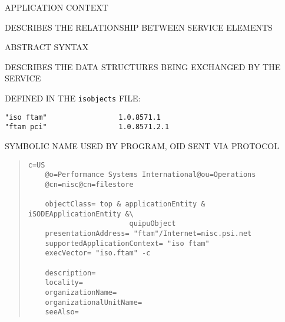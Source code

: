 

\begin{bwslide}

\begin{nrtc}
\item	APPLICATION CONTEXT
    \begin{nrtc}
    \item	DESCRIBES THE RELATIONSHIP BETWEEN SERVICE ELEMENTS
    \end{nrtc}

\item	ABSTRACT SYNTAX
    \begin{nrtc}
    \item	DESCRIBES THE DATA STRUCTURES BEING EXCHANGED BY THE SERVICE
    \end{nrtc}

\item	DEFINED IN THE \verb"isobjects" FILE:
\begin{verbatim}
"iso ftam"                 1.0.8571.1
"ftam pci"                 1.0.8571.2.1
\end{verbatim}

\item	SYMBOLIC NAME USED BY PROGRAM, OID SENT VIA PROTOCOL
\end{nrtc}
\end{bwslide}


\begin{bwslide}

\begin{quote}\small\begin{verbatim}
c=US
    @o=Performance Systems International@ou=Operations
    @cn=nisc@cn=filestore

    objectClass= top & applicationEntity & iSODEApplicationEntity &\
                        quipuObject
    presentationAddress= "ftam"/Internet=nisc.psi.net
    supportedApplicationContext= "iso ftam"
    execVector= "iso.ftam" -c

    description=
    locality=
    organizationName=
    organizationalUnitName=
    seeAlso=
\end{verbatim}\end{quote}
\end{bwslide}


